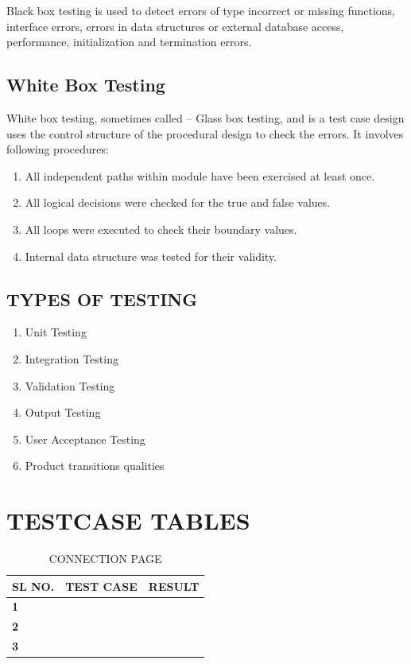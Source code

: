 \documentclass[11pt]{report} %
\begin{document}
Black box testing is used to detect errors of type incorrect or missing functions, interface errors, errors in data structures or external database access, performance, initialization and termination errors. 

\subsection{White Box Testing}
\label{subsec:White Box Testing}

White box testing, sometimes called -- Glass box testing, and is a test case design uses the control structure of the procedural design to check the errors. It involves following procedures: 

\begin{enumerate}
	\item All independent paths within module have been exercised at least once.
	\item All logical decisions were checked for the true and false values.
	\item All loops were executed to check their boundary values. 
	\item Internal data structure was tested for their validity. 
\end{enumerate}


\subsection{TYPES OF TESTING}
\label{subsec:TYPES OF TESTING}

\begin{enumerate}
	\item Unit Testing 
	\item Integration Testing
	\item Validation Testing 
	\item Output Testing 
	\item User Acceptance Testing 
	\item Product transitions qualities 
\end{enumerate}

\section{TESTCASE TABLES}
\label{sec:TESTCASE TABLES}

\begin{table}[h]
	\centering
	\caption{CONNECTION PAGE}
	\label{tab:CONNECTION PAGE}
	\begin{tabular}{|l|l|l|}
		\hline
		\textbf{SL NO.} & \textbf{TEST CASE} & \textbf{RESULT} \\ \hline
		\textbf{1}      & \textbf{}          & \textbf{}       \\ \hline
		\textbf{2}      & \textbf{}          & \textbf{}       \\ \hline
		\textbf{3}      & \textbf{}          & \textbf{}       \\ \hline
	\end{tabular}
\end{table}
\end{document}
